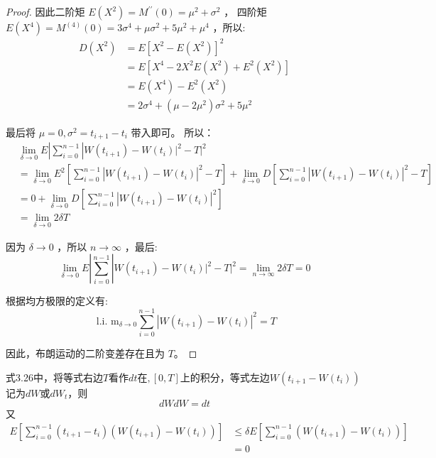 \begin{proof}
因此二阶矩 $E\left(X^2\right)=M^{\prime \prime}(0)=\mu^2+\sigma^2$ ，
四阶矩 $E\left(X^4\right)=M^{(4)}(0)=3 \sigma^4+\mu \sigma^2+5 \mu^2+\mu^4$ ，所以:
$$
\begin{aligned}
D\left(X^2\right) & =E\left[X^2-E\left(X^2\right)\right]^2 \\
& =E\left[X^4-2 X^2 E\left(X^2\right)+E^2\left(X^2\right)\right] \\
& =E\left(X^4\right)-E^2\left(X^2\right) \\
& =2 \sigma^4+\left(\mu-2 \mu^2\right) \sigma^2+5 \mu^2
\end{aligned}
$$

最后将 $\mu=0, \sigma^2=t_{i+1}-t_i$ 带入即可。
所以：
$$
\begin{aligned}
& \lim _{\delta \rightarrow 0} E\left|\sum_{i=0}^{n-1}\right| W\left(t_{i+1}\right)-\left.W\left(t_i\right)\right|^2-\left.T\right|^2 \\
& =\lim _{\delta \rightarrow 0} E^2\left[\sum_{i=0}^{n-1}\left|W\left(t_{i+1}\right)-W\left(t_i\right)\right|^2-T\right]+\lim _{\delta \rightarrow 0} D\left[\sum_{i=0}^{n-1}\left|W\left(t_{i+1}\right)-W\left(t_i\right)\right|^2-T\right] \\
& =0+\lim _{\delta \rightarrow 0} D\left[\sum_{i=0}^{n-1}\left|W\left(t_{i+1}\right)-W\left(t_i\right)\right|^2\right] \\
& =\lim _{\delta \rightarrow 0} 2 \delta T
\end{aligned}
$$

因为 $\delta \rightarrow 0$ ，所以 $n \rightarrow \infty$ ，最后:
$$
\lim _{\delta \rightarrow 0} E\left|\sum_{i=0}^{n-1}\right| W\left(t_{i+1}\right)-\left.W\left(t_i\right)\right|^2-\left.T\right|^2=\lim _{n \rightarrow \infty} 2 \delta T=0
$$

根据均方极限的定义有:
\begin{equation}
  \text { l.i. } \mathrm{m}_{\delta \rightarrow 0} \sum_{i=0}^{n-1}\left|W\left(t_{i+1}\right)-W\left(t_i\right)\right|^2=T
\end{equation}

因此，布朗运动的二阶变差存在且为 $T$。
\end{proof}

式3.26中，将等式右边$T$看作$dt \text{在}, [0, T]$上的积分，等式左边$W(t_{i+1} - W(t_i))$记为$dW \text{或}dW_t$，则
\begin{equation}
  dW dW = dt
\end{equation}
又
$$
\begin{aligned}
E\left[\sum_{i=0}^{n-1}\left(t_{i+1}-t_i\right)\left(W\left(t_{i+1}\right)-W\left(t_i\right)\right)\right] & \leq \delta E\left[\sum_{i=0}^{n-1}\left(W\left(t_{i+1}\right)-W\left(t_i\right)\right)\right] \\
& =0
\end{aligned}
$$

